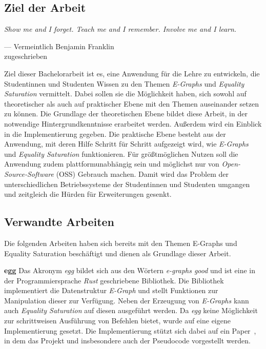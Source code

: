 \subsection{Ziel der Arbeit}

\vspace{5mm}
\begin{center}
    {\itshape
    \rmfamily
    \glqq Show me and I forget.
    Teach me and I remember. 
    Involve me and I learn.\grqq}
    \vspace{-3mm}
    \begin{flushright}
        \footnotesize
        --- Vermeintlich 
        Benjamin Franklin \\
        zugeschrieben
    \end{flushright}
\end{center}\vspace{3mm}

Ziel dieser Bachelorarbeit ist es, eine Anwendung für die Lehre zu entwickeln, die Studentinnen und Studenten Wissen zu den Themen \textit{E-Graphs} und \textit{Equality Saturation}
vermittelt. Dabei sollen sie die Möglichkeit haben, sich sowohl auf theoretischer als auch auf praktischer Ebene mit den Themen auseinander setzen zu können.
Die Grundlage der theoretischen Ebene bildet diese Arbeit, in der notwendige Hintergrundkenntnisse erarbeitet werden. Außerdem wird ein Einblick in die Implementierung gegeben. 
Die praktische Ebene besteht aus der Anwendung, mit deren Hilfe Schritt für Schritt aufgezeigt wird, wie \textit{E-Graphs} und \textit{Equality Saturation} funktionieren.
Für grö{\ss}tmöglichen Nutzen soll die Anwendung zudem plattformunabhängig sein und möglichst nur von \textit{Open-Source-Software} (OSS) Gebrauch machen.
Damit wird das Problem der unterschiedlichen Betriebssysteme der Studentinnen und Studenten umgangen und zeitgleich die Hürden für Erweiterungen gesenkt.

\subsection{Verwandte Arbeiten}\label{sub:verwandtearbeiten}

Die folgenden Arbeiten haben sich bereits mit den Themen E-Graphs und Equality Saturation beschäftigt und dienen als Grundlage dieser Arbeit.

\noindent\textbf{egg} Das Akronym \textit{egg} bildet sich aus den Wörtern \textit{e-graphs good} und ist eine in der Programmiersprache \textit{Rust} geschriebene Bibliothek.
Die Bibliothek implementiert die Datenstruktur \textit{E-Graph} und stellt Funktionen zur Manipulation dieser zur Verfügung.
Neben der Erzeugung von \textit{E-Graphs} kann auch \textit{Equality Saturation} auf diesen ausgeführt werden.
Da \textit{egg} keine Möglichkeit zur schrittweisen Ausführung von Befehlen bietet, wurde auf eine eigene Implementierung gesetzt. Die Implementierung stützt sich dabei auf ein Paper~\cite{2021-egg}, in dem 
das Projekt und insbesondere auch der Pseudocode vorgestellt werden.

